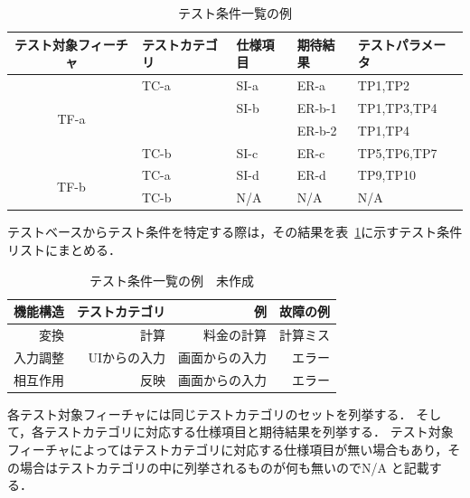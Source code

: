 \begin{table}[htbp]
  \centering
  \caption{テスト条件一覧の例}
    \begin{tabular}{|c|p{6em}|p{6em}|p{6em}|p{7.145em}|}
    \hline
    \multicolumn{1}{|p{8.855em}|}{\textbf{テスト対象フィーチャ}} & \textbf{テストカテゴリ} & \textbf{仕様項目} & \textbf{期待結果} & \textbf{テストパラメータ} \bigstrut \\
    \hline
    \multicolumn{1}{|c|}{\multirow{4}[8]{*}{TF-a}} & TC-a  & SI-a  & ER-a  & TP1,TP2 \bigstrut\\
\cline{2-5}          & \multicolumn{1}{l|}{} & SI-b  & ER-b-1 & TP1,TP3,TP4 \bigstrut\\
\cline{2-5}          & \multicolumn{1}{l|}{} & \multicolumn{1}{l|}{} & ER-b-2 & TP1,TP4 \bigstrut\\
\cline{2-5}          & TC-b  & SI-c  & ER-c  & TP5,TP6,TP7 \bigstrut\\
    \hline
    \multicolumn{1}{|c|}{\multirow{2}[4]{*}{TF-b}} & TC-a  & SI-d  & ER-d  & TP9,TP10 \bigstrut\\
\cline{2-5}          & TC-b  & N/A   & N/A   & N/A \bigstrut\\
    \hline
    \end{tabular}%
  \label{tbl:D-3-tbl3}%
\end{table}%

テストベースからテスト条件を特定する際は，その結果を表~\ref{tbl:D-3-tbl3}に示すテスト条件リストにまとめる．

\begin{table}[t]
\caption{テスト条件一覧の例　未作成}
\label{tbl:D-3-tbl2}
\begin{center}
\begin{tabular}{r|r|r|r}
機能構造&テストカテゴリ&例&故障の例\\
\hline
\hline
変換&計算&料金の計算&計算ミス\\
\hline
入力調整&UIからの入力&画面からの入力&エラー\\
\hline
相互作用&反映&画面からの入力&エラー\\
    \hline
\end{tabular}%
\end{center}
\end{table}



各テスト対象フィーチャには同じテストカテゴリのセットを列挙する．
そして，各テストカテゴリに対応する仕様項目と期待結果を列挙する．
テスト対象フィーチャによってはテストカテゴリに対応する仕様項目が無い場合もあり，その場合はテストカテゴリの中に列挙されるものが何も無いのでN/A と記載する．




